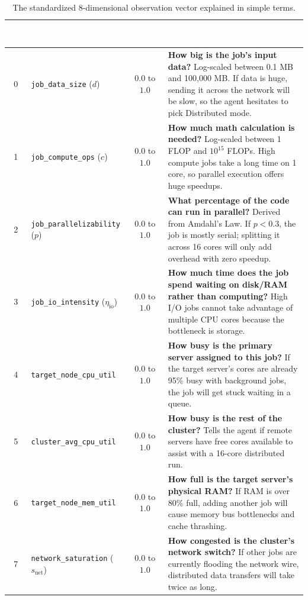 \documentclass[11pt,a4paper]{article}
\begin{document}
\begin{table}[tbp]
\centering
\footnotesize
\renewcommand{\arraystretch}{1.3}
\begin{tabularx}{\textwidth}{c l c X}
\toprule
\rowcolor{tableheader}
\textcolor{white}{\textbf{Idx}} & \textcolor{white}{\textbf{Feature Name}} & \textcolor{white}{\textbf{Value Range}} & \textcolor{white}{\textbf{What it Tells the AI Agent in Simple Words}} \\
\midrule
0 & \texttt{job\_data\_size} ($d$) & $0.0$ to $1.0$ & 
\textbf{How big is the job's input data?} Log-scaled between 0.1 MB and 100,000 MB. If data is huge, sending it across the network will be slow, so the agent hesitates to pick Distributed mode. \\
\rowcolor{altrow}
1 & \texttt{job\_compute\_ops} ($c$) & $0.0$ to $1.0$ & 
\textbf{How much math calculation is needed?} Log-scaled between 1 FLOP and $10^{15}$ FLOPs. High compute jobs take a long time on 1 core, so parallel execution offers huge speedups. \\
2 & \texttt{job\_parallelizability} ($p$) & $0.0$ to $1.0$ & 
\textbf{What percentage of the code can run in parallel?} Derived from Amdahl's Law. If $p < 0.3$, the job is mostly serial; splitting it across 16 cores will only add overhead with zero speedup. \\
\rowcolor{altrow}
3 & \texttt{job\_io\_intensity} ($\eta_{\text{io}}$) & $0.0$ to $1.0$ & 
\textbf{How much time does the job spend waiting on disk/RAM rather than computing?} High I/O jobs cannot take advantage of multiple CPU cores because the bottleneck is storage. \\
4 & \texttt{target\_node\_cpu\_util} & $0.0$ to $1.0$ & 
\textbf{How busy is the primary server assigned to this job?} If the target server's cores are already 95\% busy with background jobs, the job will get stuck waiting in a queue. \\
\rowcolor{altrow}
5 & \texttt{cluster\_avg\_cpu\_util} & $0.0$ to $1.0$ & 
\textbf{How busy is the rest of the cluster?} Tells the agent if remote servers have free cores available to assist with a 16-core distributed run. \\
6 & \texttt{target\_node\_mem\_util} & $0.0$ to $1.0$ & 
\textbf{How full is the target server's physical RAM?} If RAM is over 80\% full, adding another job will cause memory bus bottlenecks and cache thrashing. \\
\rowcolor{altrow}
7 & \texttt{network\_saturation} ($s_{\text{net}}$) & $0.0$ to $1.0$ & 
\textbf{How congested is the cluster's network switch?} If other jobs are currently flooding the network wire, distributed data transfers will take twice as long. \\
\bottomrule
\end{tabularx}
\caption{The standardized 8-dimensional observation vector explained in simple terms.}
\label{tab:observation_features}
\end{table}
\end{document}

